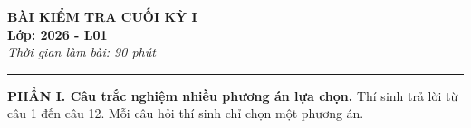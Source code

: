 \documentclass[12pt]{article}
\begin{document}
	
	\begin{center}
		{\Large \textbf{BÀI KIỂM TRA CUỐI KỲ I}} \\[6pt]
		{\large \textbf{Lớp: 2026 - L01}} \\[6pt]
		\textit{Thời gian làm bài: 90 phút}
	\end{center}
	\vspace{3mm}
	\hrule
	\vspace{6mm}
	
	\noindent\textbf{PHẦN I. Câu trắc nghiệm nhiều phương án lựa chọn.} Thí sinh trả lời từ câu 1 đến câu 12. Mỗi câu hỏi thí sinh chỉ chọn một phương án.
	\vspace{3mm}
	
\end{document}
